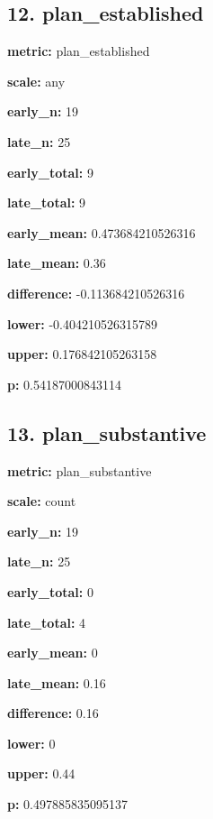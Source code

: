 \documentclass[10pt,a4paper]{article}
\begin{document}
\subsection*{12.\allowbreak{} plan\_\allowbreak{}established}
\textbf{metric:} plan\_\allowbreak{}established\par
\textbf{scale:} any\par
\textbf{early\_\allowbreak{}n:} 19\par
\textbf{late\_\allowbreak{}n:} 25\par
\textbf{early\_\allowbreak{}total:} 9\par
\textbf{late\_\allowbreak{}total:} 9\par
\textbf{early\_\allowbreak{}mean:} 0.\allowbreak{}473684210526316\par
\textbf{late\_\allowbreak{}mean:} 0.\allowbreak{}36\par
\textbf{difference:} -\allowbreak{}0.\allowbreak{}113684210526316\par
\textbf{lower:} -\allowbreak{}0.\allowbreak{}404210526315789\par
\textbf{upper:} 0.\allowbreak{}176842105263158\par
\textbf{p:} 0.\allowbreak{}54187000843114\par
\subsection*{13.\allowbreak{} plan\_\allowbreak{}substantive}
\textbf{metric:} plan\_\allowbreak{}substantive\par
\textbf{scale:} count\par
\textbf{early\_\allowbreak{}n:} 19\par
\textbf{late\_\allowbreak{}n:} 25\par
\textbf{early\_\allowbreak{}total:} 0\par
\textbf{late\_\allowbreak{}total:} 4\par
\textbf{early\_\allowbreak{}mean:} 0\par
\textbf{late\_\allowbreak{}mean:} 0.\allowbreak{}16\par
\textbf{difference:} 0.\allowbreak{}16\par
\textbf{lower:} 0\par
\textbf{upper:} 0.\allowbreak{}44\par
\textbf{p:} 0.\allowbreak{}497885835095137\par
\end{document}
